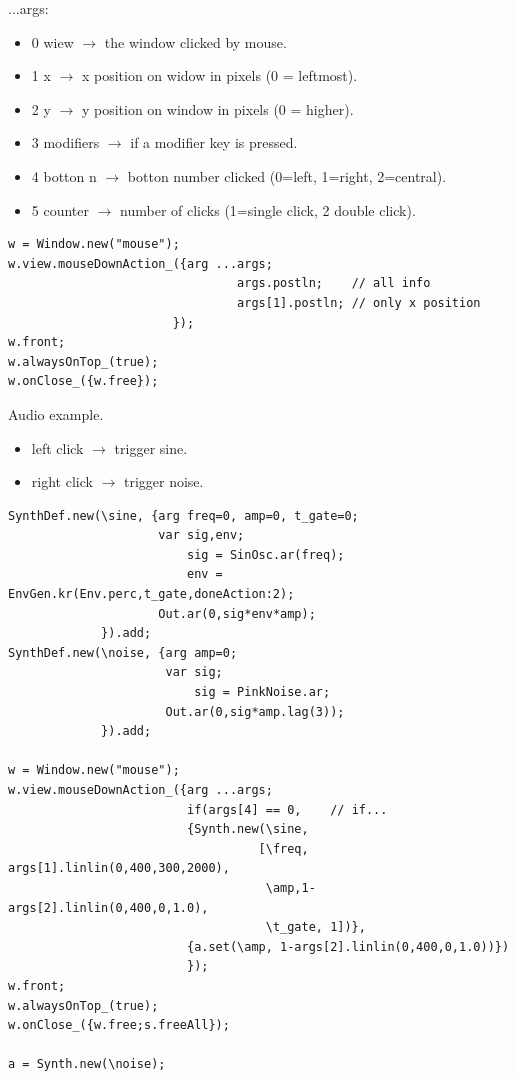 ...args:

\begin{itemize}
\tightlist
\item 0 wiew \(\rightarrow\) the window clicked by mouse.
\item 1 x \(\rightarrow\) x position on widow in pixels (0 = leftmost).
\item 2 y \(\rightarrow\) y position on window in pixels (0 = higher). 
\item 3 modifiers \(\rightarrow\) if a modifier key is pressed.
\item 4 botton n \(\rightarrow\) botton number clicked (0=left, 1=right, 2=central).
\item 5 counter \(\rightarrow\) number of clicks (1=single click, 2 double click).
\end{itemize}

\begin{lstlisting}[frame=single, caption=mouseDownAction model] 
w = Window.new("mouse");
w.view.mouseDownAction_({arg ...args;
                                args.postln;    // all info
                                args[1].postln; // only x position
                       });
w.front;
w.alwaysOnTop_(true);
w.onClose_({w.free});
\end{lstlisting} 

Audio example.

\begin{itemize}
\tightlist
\item left click $\rightarrow$ trigger sine.
\item right click $\rightarrow$ trigger noise.
\end{itemize}

\begin{lstlisting}[frame=single] 
SynthDef.new(\sine, {arg freq=0, amp=0, t_gate=0;
                     var sig,env;
                         sig = SinOsc.ar(freq);
                         env = EnvGen.kr(Env.perc,t_gate,doneAction:2);
                     Out.ar(0,sig*env*amp);
             }).add;
SynthDef.new(\noise, {arg amp=0;
                      var sig;
                          sig = PinkNoise.ar;
                      Out.ar(0,sig*amp.lag(3));                  
             }).add;

w = Window.new("mouse");
w.view.mouseDownAction_({arg ...args;
                         if(args[4] == 0,    // if...
                         {Synth.new(\sine,
                                   [\freq, args[1].linlin(0,400,300,2000),
                                    \amp,1-args[2].linlin(0,400,0,1.0),
                                    \t_gate, 1])}, 
		                 {a.set(\amp, 1-args[2].linlin(0,400,0,1.0))})                                  
                         });
w.front;
w.alwaysOnTop_(true);
w.onClose_({w.free;s.freeAll});

a = Synth.new(\noise);
\end{lstlisting} 

